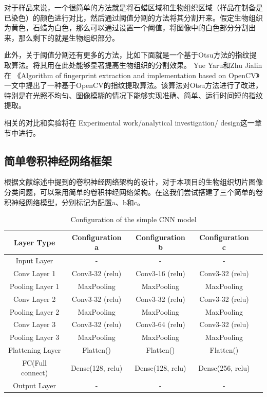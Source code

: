 对于样品来说，一个很简单的方法就是将石蜡区域和生物组织区域（样品在制备是已染色）的颜色进行对比，然后通过阈值分割的方法将其分割开来。假定生物组织为黄色，石蜡为白色，那么可以通过设置一个阈值，将图像中的白色部分分割出来，那么剩下的就是生物组织部分。

此外，关于阈值分割还有更多的方法，比如下面就是一个基于Otsu方法的指纹提取算法。将其用在此处能够显著提高生物组织的分割效果。
Yue Yaru和Zhu Jialin 在 《Algorithm of fingerprint extraction and implementation based on OpenCV》一文中提出了一种基于OpenCV的指纹提取算法。该算法对Otsu方法进行了改进，特别是在光照不均匀、图像模糊的情况下能够实现准确、简单、运行时间短的指纹提取。\cite{3.3}

相关的对比和实验将在 Experimental work/analytical investigation/ design这一章节中进行。

\subsection{简单卷积神经网络框架}

根据文献综述中提到的卷积神经网络架构的设计，对于本项目的生物组织切片图像分类问题，可以采用简单的卷积神经网络架构。在这我们尝试搭建了三个简单的卷积神经网络模型，分别标记为配置a、b和c。

\begin{table}[H]
    \centering
    \caption{Configuration of the simple CNN model}
    \begin{tabular}{ccccc}
        \toprule
        \textbf{Layer Type} & \textbf{Configuration a} & \textbf{Configuration b} & \textbf{Configuration c} \\
        \midrule
        Input Layer & - & - & - \\
        Conv Layer 1 & Conv3-32 (relu) & Conv3-16 (relu) & Conv3-32 (relu) \\
        Pooling Layer 1 & MaxPooling & MaxPooling& MaxPooling \\
        Conv Layer 2 & Conv3-32 (relu) & Conv3-32 (relu) & Conv3-32 (relu) \\
        Pooling Layer 2 & MaxPooling & MaxPooling& MaxPooling \\
        Conv Layer 3 & Conv3-32 (relu) & Conv3-64 (relu) & Conv3-32 (relu) \\
        Pooling Layer 3 & MaxPooling & MaxPooling& MaxPooling \\
        Flattening Layer & Flatten() & Flatten() & Flatten() \\
        FC(Full connect) & Dense(128, relu) & Dense(128, relu) & Dense(256, relu) \\
        Output Layer & - & - & - \\
        \bottomrule
    \end{tabular}
    \label{tab:cnn_simple_configuration}
    \end{table}

